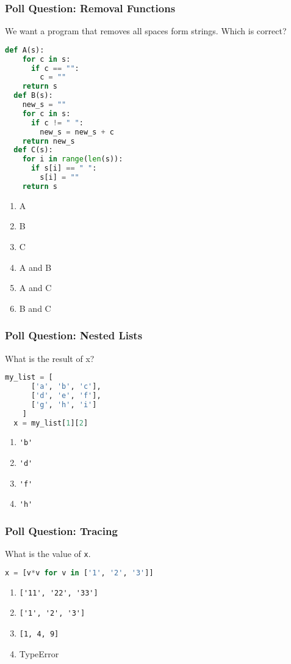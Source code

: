 \documentclass{beamer}
\begin{document}
%
%
\begin{frame}[fragile]
  \frametitle{Poll Question: Removal Functions}
  We want a program that removes all spaces form strings. Which is correct?\\
  \hfill
  \begin{minipage}{0.48\textwidth}
    \begin{lstlisting}[language=Python, autogobble]
  def A(s):
    for c in s:
      if c == "":
        c = ""
    return s
  def B(s):
    new_s = ""
    for c in s:
      if c != " ":
        new_s = new_s + c
    return new_s
  def C(s):
    for i in range(len(s)):
      if s[i] == " ":
        s[i] = ""
    return s\end{lstlisting}
  \end{minipage}
  \hfill
  \begin{minipage}{0.48\textwidth}
    \hfill
    \begin{enumerate}[A]
      \item A
      \item B
      \item C
      \item A and B
      \item A and C
      \item B and C
    \end{enumerate}
  \end{minipage}
\end{frame}


%
%
\begin{frame}[fragile]
  \frametitle{Poll Question: Nested Lists}
  What is the result of x?
  \begin{lstlisting}[language=Python, autogobble]
  my_list = [
      ['a', 'b', 'c'],
      ['d', 'e', 'f'],
      ['g', 'h', 'i']
    ]
  x = my_list[1][2]
  \end{lstlisting}
  \vfill
  \begin{enumerate}[A]
    \item \lstinline|'b'|
    \item \lstinline|'d'|
    \item \lstinline|'f'|
    \item \lstinline|'h'|
  \end{enumerate}
\end{frame}

%
%
\begin{frame}[fragile]
  \frametitle{Poll Question: Tracing}
  What is the value of \lstinline|x|.
  \begin{lstlisting}[language=Python, autogobble]
  x = [v*v for v in ['1', '2', '3']]
  \end{lstlisting}
  \vfill
  \begin{enumerate}[A]
    \item \lstinline|['11', '22', '33']| 
    \item \lstinline|['1', '2', '3']|
    \item \lstinline|[1, 4, 9]|
    \item TypeError
  \end{enumerate}
\end{frame}
\end{document}
